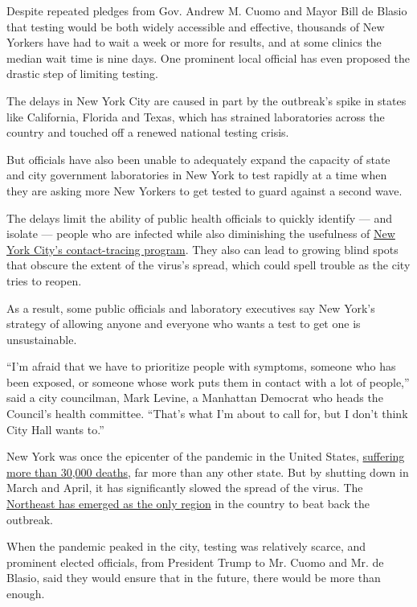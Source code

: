 Despite repeated pledges from Gov. Andrew M. Cuomo and Mayor Bill de
Blasio that testing would be both widely accessible and effective,
thousands of New Yorkers have had to wait a week or more for results,
and at some clinics the median wait time is nine days. One prominent
local official has even proposed the drastic step of limiting testing.

The delays in New York City are caused in part by the outbreak's spike
in states like California, Florida and Texas, which has strained
laboratories across the country and touched off a renewed national
testing crisis.

But officials have also been unable to adequately expand the capacity of
state and city government laboratories in New York to test rapidly at a
time when they are asking more New Yorkers to get tested to guard
against a second wave.

The delays limit the ability of public health officials to quickly
identify --- and isolate --- people who are infected while also
diminishing the usefulness of
\href{https://www.nytimes.com/2020/06/21/nyregion/nyc-contact-tracing.html}{New
York City's contact-tracing program}. They also can lead to growing
blind spots that obscure the extent of the virus's spread, which could
spell trouble as the city tries to reopen.

As a result, some public officials and laboratory executives say New
York's strategy of allowing anyone and everyone who wants a test to get
one is unsustainable.

``I'm afraid that we have to prioritize people with symptoms, someone
who has been exposed, or someone whose work puts them in contact with a
lot of people,'' said a city councilman, Mark Levine, a Manhattan
Democrat who heads the Council's health committee. ``That's what I'm
about to call for, but I don't think City Hall wants to.''

New York was once the epicenter of the pandemic in the United States,
\href{https://www.nytimes.com/interactive/2020/us/new-york-coronavirus-cases.html}{suffering
more than 30,000 deaths}, far more than any other state. But by shutting
down in March and April, it has significantly slowed the spread of the
virus. The
\href{https://www.nytimes.com/2020/07/22/us/coronavirus-northeast-governors.html}{Northeast
has emerged as the only region} in the country to beat back the
outbreak.

When the pandemic peaked in the city, testing was relatively scarce, and
prominent elected officials, from President Trump to Mr. Cuomo and Mr.
de Blasio, said they would ensure that in the future, there would be
more than enough.

